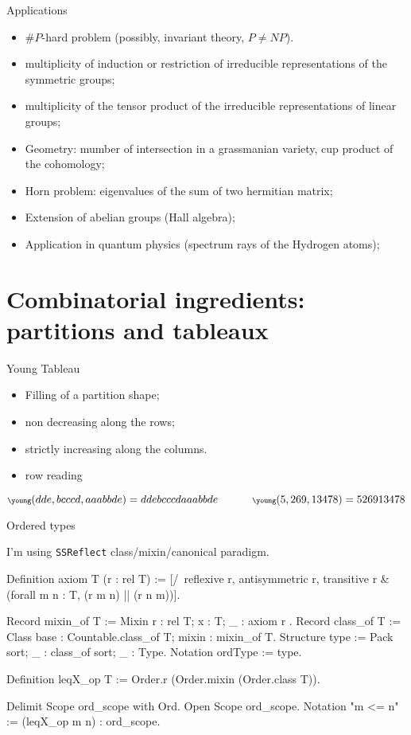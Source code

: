 \documentclass[compress,11pt]{beamer}
\begin{document}
\begin{frame}{Applications}
  \begin{itemize}
  \item $\#P$-hard problem (possibly, invariant theory, $P \neq NP$).
  \item multiplicity of induction or restriction of irreducible representations
    of the symmetric groups;
  \item multiplicity of the tensor product of the irreducible representations
    of linear groups;
  \item Geometry: mumber of intersection in a grassmanian variety, cup product
    of the cohomology;
  \item Horn problem: eigenvalues of the sum of two hermitian matrix;
  \item Extension of abelian groups (Hall algebra);
  \item Application in quantum physics (spectrum rays of the Hydrogen atoms);
  \end{itemize}
\end{frame}

\section{Combinatorial ingredients: partitions and tableaux}

\begin{frame}{Young Tableau}

  \begin{DEFN}
    \begin{itemize}
    \item Filling of a partition shape;
    \item non decreasing along the rows;
    \item strictly increasing along the columns.
      \medskip
    \item row reading
    \end{itemize}
  \end{DEFN}
  \[\scriptsize
  \young(dde,bcccd,aaabbde) = ddebcccdaaabbde
  \qquad\qquad
  \young(5,269,13478)=526913478\]
  
\end{frame}

\begin{frame}[fragile]{Ordered types}
  
  I'm using \texttt{SSReflect} class/mixin/canonical paradigm.
\begin{coqcode}
Definition axiom T (r : rel T) :=
    [/\ reflexive r, antisymmetric r, transitive r &
        (forall m n : T, (r m n) || (r n m))].

Record mixin_of T := Mixin { r : rel T; x : T; _ : axiom r }.
Record class_of T := Class {base : Countable.class_of T; mixin : mixin_of T}.
Structure type := Pack {sort; _ : class_of sort; _ : Type}.
Notation ordType := type.

Definition leqX_op T := Order.r (Order.mixin (Order.class T)).

Delimit Scope ord_scope with Ord.
Open Scope ord_scope.
Notation "m <= n" := (leqX_op m n) : ord_scope.
\end{coqcode}
\end{frame}
\end{document}
